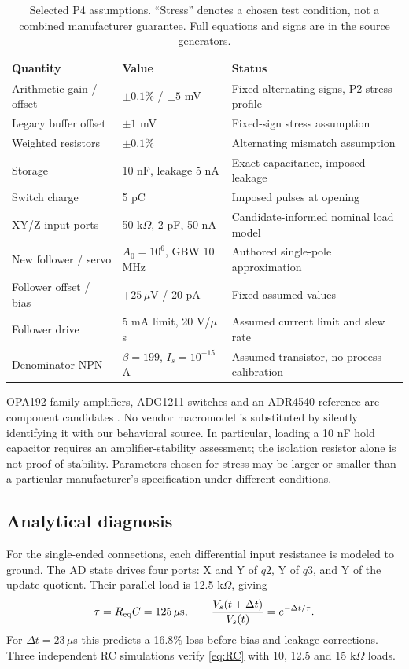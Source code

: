\documentclass[11pt,a4paper]{article}
\theoremstyle{remark}\newtheorem{remark}[theorem]{Remark}
\numberwithin{equation}{section}
\begin{document}
\begin{table}[htbp]\centering\small
\caption{Selected P4 assumptions. ``Stress'' denotes a chosen test condition, not a combined manufacturer guarantee. Full equations and signs are in the source generators.}\label{tab:params}
\begin{tabularx}{\linewidth}{@{}p{.34\linewidth}p{.29\linewidth}X@{}}\toprule
Quantity & Value & Status\\\midrule
Arithmetic gain / offset & $\pm0.1\%$ / $\pm5$ mV & Fixed alternating signs, P2 stress profile\\
Legacy buffer offset & $\pm1$ mV & Fixed-sign stress assumption\\
Weighted resistors & $\pm0.1\%$ & Alternating mismatch assumption\\
Storage & 10 nF, leakage 5 nA & Exact capacitance, imposed leakage\\
Switch charge & 5 pC & Imposed pulses at opening\\
XY/Z input ports & 50 k$\Omega$, 2 pF, 50 nA & Candidate-informed nominal load model\\
New follower / servo & $A_0=10^6$, GBW 10 MHz & Authored single-pole approximation\\
Follower offset / bias & $+25\,\mu$V / 20 pA & Fixed assumed values\\
Follower drive & 5 mA limit, 20 V/$\mu$s & Assumed current limit and slew rate\\
Denominator NPN & $\beta=199$, $I_s=10^{-15}$ A & Assumed transistor, no process calibration\\\bottomrule
\end{tabularx}
\end{table}

OPA192-family amplifiers, ADG1211 switches and an ADR4540 reference are component candidates \citep{opa192,adg1211,adr4540}. No vendor macromodel is substituted by silently identifying it with our behavioral source. In particular, loading a 10 nF hold capacitor requires an amplifier-stability assessment; the isolation resistor alone is not proof of stability. Parameters chosen for stress may be larger or smaller than a particular manufacturer's specification under different conditions.

\subsection{Analytical diagnosis}
For the single-ended connections, each differential input resistance is modeled to ground. The AD state drives four ports: X and Y of $q2$, Y of $q3$, and Y of the update quotient. Their parallel load is 12.5 k$\Omega$, giving
\begin{equation}
 \tau=R_{\rm eq}C=125\,\mu\text{s},\qquad
 \frac{V_s(t+\Delta t)}{V_s(t)}=e^{-\Delta t/\tau}.\label{eq:RC}
\end{equation}
For $\Delta t=23\,\mu$s this predicts a 16.8\% loss before bias and leakage corrections. Three independent RC simulations verify \eqref{eq:RC} with 10, 12.5 and 15 k$\Omega$ loads.
\end{document}
